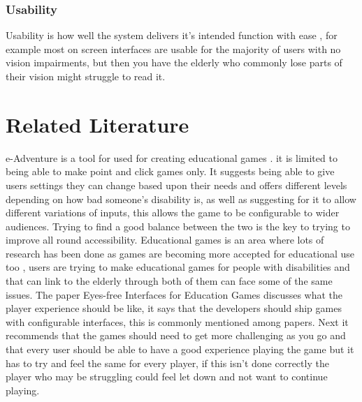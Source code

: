 \documentclass[journal]{IEEEtran}
\begin{document}
\subsubsection{Usability} Usability is how well the system delivers it's intended function with ease \cite{hersh_accessibility_2012}, for example most on screen interfaces are usable for the majority of users with no vision impairments, but then you have the elderly who commonly lose parts of their vision \cite{correia_global_2016} might struggle to read it.

\section{Related Literature}
e-Adventure is a tool for used for creating educational games \cite{torrente_introducing_2011}. it is limited to being able to make point and click games only. It suggests being able to give users settings they can change based upon their needs and offers different levels depending on how bad someone's disability is, as well as suggesting for it to allow different variations of inputs, this allows the game to be configurable to wider audiences. Trying to find a good balance between the two is the key to trying to improve all round accessibility. 
\newline
Educational games is an area  where lots of research has been done as games are becoming more accepted for educational use too \cite{torrente_eyes-free_2012}, users are trying to make educational games for people with disabilities and that can link to the elderly through both of them can face some of the same issues. The paper Eyes-free Interfaces for Education Games \cite{torrente_eyes-free_2012} discusses what the player experience should be like, it says that the developers should ship games with configurable interfaces, this is commonly mentioned among papers. Next it recommends that the games should need to get more challenging as you go and that every user should be able to have a good experience playing the game but it has to try and feel the same for every player, if this isn't done correctly the player who may be struggling could feel let down and not want to continue playing.
\newline
\end{document}
